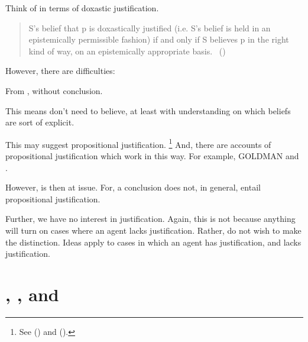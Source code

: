 \begin{note}
  Think of \ros{} in terms of doxastic justification.

  \begin{quote}
    S's belief that p is doxastically justified (i.e. S's belief is held in an epistemically permissible fashion) if and only if S believes p in the right kind of way, on an epistemically appropriate basis.%
    \mbox{ }\hfill\mbox{(\citeyear{Bondy:2018tk})}
  \end{quote}

  However, there are difficulties:

  From \supportII{}, \ros{} without conclusion.

  This means don't need to believe, at least with understanding on which beliefs are sort of explicit.

  This may suggest propositional justification.%
  \footnote{
    See (\cite{Firth:1978vi}) and (\cite[esp.\ fn.1]{Silva:2020aa}).
  }
  And, there are accounts of propositional justification which work in this way.
  For example, GOLDMAN and \citeauthor{Turri:2010aa}.

  However, \supportI{} is then at issue.
  For, a conclusion does not, in general, entail propositional justification.
\end{note}

\begin{note}
  Further, we have no interest in justification.
  Again, this is not because anything will turn on cases where an agent lacks justification.
  Rather, do not wish to make the distinction.
  Ideas apply to cases in which an agent has justification, and lacks justification.
\end{note}

\section{\qWhyV{}, \qHowV{}, and \issueConstraint{}}
\label{cha:var:sec:vars}

